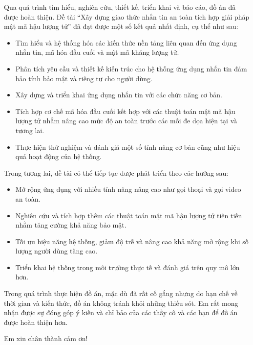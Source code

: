 Qua quá trình tìm hiểu, nghiên cứu, thiết kế, triển khai và báo cáo, đồ án đã được hoàn thiện. Đề tài “Xây dựng giao thức nhắn tin an toàn tích hợp giải pháp mật mã hậu lượng tử” đã đạt được một số kết quả nhất định, cụ thể như sau:

\begin{itemize}
    \item Tìm hiểu và hệ thống hóa các kiến thức nền tảng liên quan đến ứng dụng nhắn tin, mã hóa đầu cuối và mật mã kháng lượng tử.
    \item Phân tích yêu cầu và thiết kế kiến trúc cho hệ thống ứng dụng nhắn tin đảm bảo tính bảo mật và riêng tư cho người dùng.
    \item Xây dựng và triển khai ứng dụng nhắn tin với các chức năng cơ bản.
    \item Tích hợp cơ chế mã hóa đầu cuối kết hợp với các thuật toán mật mã hậu lượng tử nhằm nâng cao mức độ an toàn trước các mối đe dọa hiện tại và tương lai.
    \item Thực hiện thử nghiệm và đánh giá một số tính năng cơ bản cũng như hiệu quả hoạt động của hệ thống.
\end{itemize}

Trong tương lai, đề tài có thể tiếp tục được phát triển theo các hướng sau:

\begin{itemize}
    \item Mở rộng ứng dụng với nhiều tính năng nâng cao như gọi thoại và gọi video an toàn.
    \item Nghiên cứu và tích hợp thêm các thuật toán mật mã hậu lượng tử tiên tiến nhằm tăng cường khả năng bảo mật.
    \item Tối ưu hiệu năng hệ thống, giảm độ trễ và nâng cao khả năng mở rộng khi số lượng người dùng tăng cao.
    \item Triển khai hệ thống trong môi trường thực tế và đánh giá trên quy mô lớn hơn.
\end{itemize}

Trong quá trình thực hiện đồ án, mặc dù đã rất cố gắng nhưng do hạn chế về thời gian và kiến thức, đồ án không tránh khỏi những thiếu sót. Em rất mong nhận được sự đóng góp ý kiến và chỉ bảo của các thầy cô và các bạn để đồ án được hoàn thiện hơn.

Em xin chân thành cảm ơn!